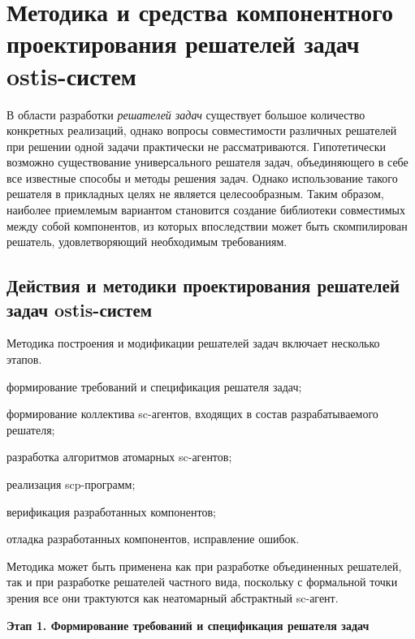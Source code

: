 \chapter{Методика и средства компонентного проектирования решателей задач ostis-систем}
\label{chapter_ps_design}


В области разработки \textit{решателей задач} существует большое количество конкретных реализаций, однако вопросы совместимости различных решателей при решении одной задачи практически не рассматриваются. Гипотетически возможно существование универсального решателя задач, объединяющего в себе все известные способы и методы решения задач. Однако использование такого решателя в прикладных целях не является целесообразным. Таким образом, наиболее приемлемым вариантом становится создание библиотеки совместимых между собой компонентов, из которых впоследствии может быть скомпилирован решатель, удовлетворяющий необходимым требованиям.

\section{Действия и методики проектирования решателей задач ostis-систем}

Методика построения и модификации решателей задач включает несколько этапов. 
\begin{textitemize}
    \item формирование требований и спецификация решателя задач;
    \item формирование коллектива sc-агентов, входящих в состав разрабатываемого решателя;
    \item разработка алгоритмов атомарных sc-агентов;
    \item реализация scp-программ;
    \item верификация разработанных компонентов;
    \item отладка разработанных компонентов, исправление ошибок.
\end{textitemize}

Методика может быть применена как при разработке объединенных решателей, так и при разработке решателей частного вида, поскольку с формальной точки зрения все они трактуются как неатомарный абстрактный sc-агент.

\textbf{Этап 1. Формирование требований и спецификация  решателя задач}

